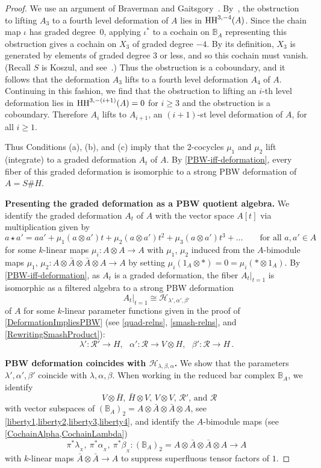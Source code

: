 \documentclass[11pt]{amsart}
\numberwithin{equation}{section}
\newcommand{\X}{_X}
\newcommand{\alphax}{\alpha_{\X}}
\newcommand{\betax}{\beta_{\X}}
\newcommand{\lambdax}{\lambda_{\X}}
\newcommand{\A}{A}%
\newcommand{\sA}{A }
\newcommand{\R}{\mathcal{R}}
\newcommand{\BB}{\mathbb{B}} %
\renewcommand{\_}[1]{\mbox{$_{\left( #1 \right)}$}}
\newcommand{\ot}{\otimes}
\newcommand{\Ho}{H}%
\newcommand{\cH}{\mathcal{H}}
\newcommand{\HH}{{\rm HH}}
\begin{document}
{\begin{proof}
We use an argument of Braverman and Gaitsgory~\cite{Braverman-Gaitsgory}. 
By~\cite[Proposition 1.5]{Braverman-Gaitsgory}, 
the obstruction to lifting $A_3$ to a fourth level deformation
of $A$ lies in $\HH^{3,-4}(A)$.
Since the chain map $\iota$ has graded degree~0,
applying  $\iota^*$ to a cochain on $\BB_A$ representing this 
obstruction gives
a cochain on $X_3$ of graded degree $-4$. 
By its definition, 
$X_3$ is generated by elements of graded degree 3
or less, and so this cochain must vanish.
(Recall $S$ is Koszul, and see~\cite[Definition~3.4]{Braverman-Gaitsgory}.) 
Thus the obstruction is a coboundary, and it follows that 
the deformation $A_3$ lifts
to a fourth level deformation $A_4$ of $A$.
Continuing in this fashion, we find that
the obstruction to lifting an $i$-th level deformation 
lies in $\HH^{3, -(i+1)}(A)=0$ for $i\geq 3$
and the obstruction is a coboundary.
Therefore 
$A_i$ lifts to $A_{i+1}$, 
an $(i+1)$-st level deformation of $A$, for all $i\geq 1$.

Thus Conditions (a), (b), and (c) imply that the
$2$-cocycles $\mu_1$ and $\mu_2$ lift
(integrate) to a graded deformation 
$\A_t$ of $\A$.
By \cref{PBW-iff-deformation},
every fiber of this graded deformation is isomorphic to a strong 
PBW deformation of $A=S\# H$.

{\bf Presenting the graded deformation
  as a PBW quotient algebra.}
We identify the graded deformation 
$\A_t$ of $\A$
with the vector space $\A[t]$ via multiplication given by
$$
a\star a'=a a'+\mu_1(a\ot a')t+\mu_2(a\ot a')t^2 + \mu_3(a\ot a')t^3+\ldots
\qquad\text{
  for all $a,a'\in A$}
$$
for some $k$-linear maps $\mu_i:A\ot A\rightarrow A$
with $\mu_1$, $\mu_2$ induced from 
the $A$-bimodule maps $\mu_1$, $\mu_2:A\ot \bar A\ot \bar A \ot A
\rightarrow A$ by setting $\mu_i(1_A\ot *)=0=\mu_i(*\ot 1_A)$.
By \cref{PBW-iff-deformation}, as $\A_t$ is a graded deformation,
the fiber
$\A_t|_{t=1}$ is isomorphic as a filtered algebra
to a strong PBW deformation
$$
\A_t\big|_{t=1} \cong \cH_{\lambda',\alpha',\beta'}
$$
of $\A$ for some $k$-linear parameter functions
given in the proof of \cref{DeformationImpliesPBW}
(see \cref{quad-relns}, \cref{smash-relns}, 
and 
  \cref{RewritingSmashProduct}):
\[
  \lambda': \R'\longrightarrow \Ho,\ \ \ 
  \alpha': \R \longrightarrow V\ot \Ho, \ \ \
    \beta': \R\longrightarrow \Ho
    \, .
\]


{\bf PBW deformation coincides
  with $\cH_{\lambda,\beta,\alpha}$.}
We show that the parameters $\lambda',\alpha',\beta'$
coincide with $\lambda,\alpha,\beta$.
When working in the reduced bar complex $\BB_A$, we identify
$$\text{ 
  $V\ot \bar H$, \ $\bar H \ot V$, \ $V\ot V$, \ $\R'$, and $\R$}
$$
    with 
    vector subspaces of 
    $(\BB_A)_2=A\ot \bar A \ot \bar A \ot A $,
    see \cref{liberty1,liberty2,liberty3,liberty4},
    and identify the $A$-bimodule maps
    (see \cref{CochainAlpha,CochainLambda}) 
$$\pi^* \lambdax,\ \pi^* \alphax, \ \pi^* \betax: (\BB_A)_2=A\ot \bar A
\ot \bar A \ot A \longrightarrow A$$
with $k$-linear maps $\bar A\ot \bar A
\rightarrow A$
to suppress superfluous tensor factors of $1$.



\end{proof}}
\end{document}
